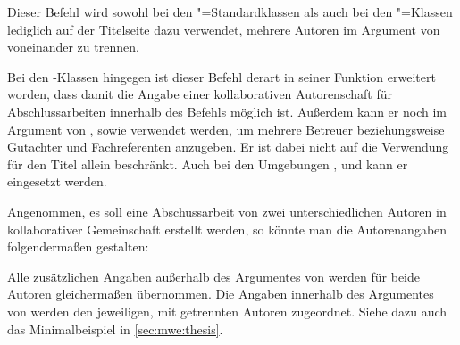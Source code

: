 \documentclass[%
  english,ngerman,%
  headings=optiontoheadandtoc,captions=tableheading,numbers=noenddot,%
  chapterpage,cdfoot,%
]{tudscrman}
\begin{document}
\begin{Declaration}{}
\printdeclarationlist%
%
%
Dieser Befehl wird sowohl bei den "=Standardklassen als auch bei 
den \KOMAScript"=Klassen lediglich auf der Titelseite dazu verwendet, mehrere 
Autoren im Argument von  voneinander zu trennen.

Bei den \TUDScript-Klassen hingegen ist dieser Befehl derart in seiner Funktion 
erweitert worden, dass damit die Angabe einer kollaborativen Autorenschaft für 
Abschlussarbeiten innerhalb des Befehls  möglich ist. Außerdem 
kann er noch im Argument von ,  sowie 
 verwendet werden, um mehrere Betreuer beziehungsweise Gutachter 
und Fachreferenten anzugeben. Er ist dabei nicht auf die Verwendung für den 
Titel allein beschränkt. Auch bei den Umgebungen , 
 und  kann er eingesetzt werden.
%
\begin{Example}
Angenommen, es soll eine Abschussarbeit von zwei unterschiedlichen Autoren in 
kollaborativer Gemeinschaft erstellt werden, so könnte man die Autorenangaben 
folgendermaßen gestalten:
\begin{code}
\author{%
  Mickey Mouse
\and%
  Donald Duck
}
\end{code}
Alle zusätzlichen Angaben außerhalb des Argumentes von  werden 
für beide Autoren gleichermaßen übernommen. Die Angaben innerhalb des Argumentes 
von  werden den jeweiligen, mit  getrennten Autoren 
zugeordnet. Siehe dazu auch das Minimalbeispiel in \autoref{sec:mwe:thesis}.
\end{Example}
\end{Declaration}
\end{document}
